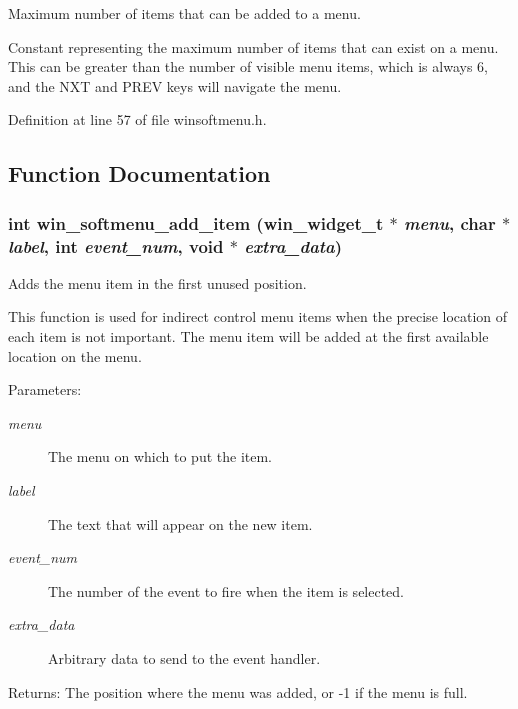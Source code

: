 Maximum number of items that can be added to a menu. 

Constant representing the maximum number of items that can exist on a menu. This can be greater than the number of visible menu items, which is always 6, and the NXT and PREV keys will navigate the menu. 

Definition at line 57 of file winsoftmenu.h.

\subsection{Function Documentation}
\subsubsection{\setlength{\rightskip}{0pt plus 5cm}int win\_\-softmenu\_\-add\_\-item ({\bf win\_\-widget\_\-t} $\ast$ {\em menu}, char $\ast$ {\em label}, int {\em event\_\-num}, void $\ast$ {\em extra\_\-data})}\label{winsoftmenu_8h_a3}


Adds the menu item in the first unused position. 

This function is used for indirect control menu items when the precise location of each item is not important. The menu item will be added at the first available location on the menu.

\begin{Desc}
\item[Parameters:]
\begin{description}
\item[{\em menu}]The menu on which to put the item. \item[{\em label}]The text that will appear on the new item. \item[{\em event\_\-num}]The number of the event to fire when the item is selected. \item[{\em extra\_\-data}]Arbitrary data to send to the event handler.\end{description}
\end{Desc}
\begin{Desc}
\item[Returns:]The position where the menu was added, or -1 if the menu is full. \end{Desc}
